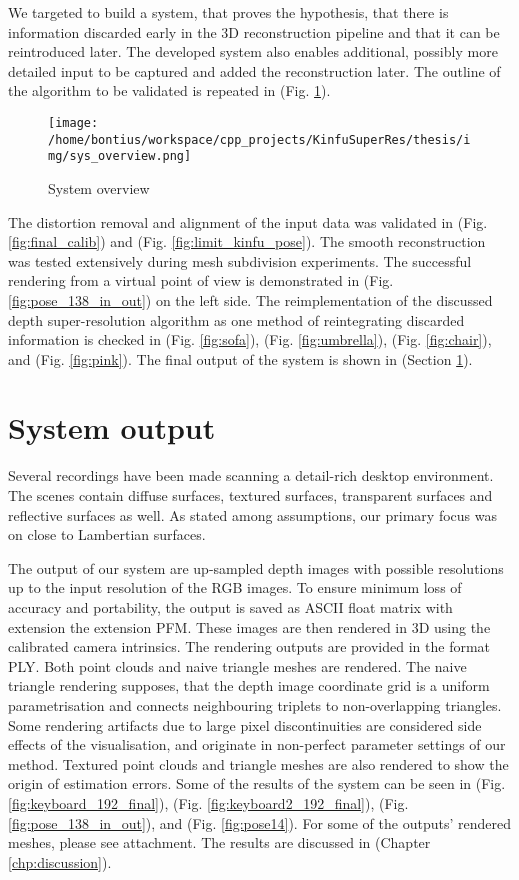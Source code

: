 \documentclass{ucl_thesis}
\newcommand{\figref}[1]{(Fig. \ref{#1})}
\newcommand{\secref}[1]{(Section \ref{#1})}
\newcommand{\chpref}[1]{(Chapter \ref{#1})}
\begin{document}
We targeted to build a system, that proves the hypothesis, that there is information discarded early in the 3D reconstruction pipeline and that it can be reintroduced later. The developed system also enables additional, possibly more detailed input to be captured and added the reconstruction later. The outline of the algorithm to be validated is repeated in \figref{fig:sys_overview2}.

\begin{figure}[h!]\centering
    \texttt{[image: /home/bontius/workspace/cpp\_projects/KinfuSuperRes/thesis/img/sys\_overview.png]}
    \caption{System overview}
    \label{fig:sys_overview2}
\end{figure}

The distortion removal and alignment of the input data was validated in \figref{fig:final_calib} and \figref{fig:limit_kinfu_pose}. The smooth reconstruction was tested extensively during mesh subdivision experiments. The successful rendering from a virtual point of view is demonstrated in \figref{fig:pose_138_in_out} on the left side. The reimplementation of the discussed depth super-resolution algorithm as one method of reintegrating discarded information is checked in \figref{fig:sofa}, \figref{fig:umbrella}, \figref{fig:chair}, and \figref{fig:pink}. The final output of the system is shown in \secref{sec:results}.

\section{System output}
\label{sec:results}

\par Several recordings have been made scanning a detail-rich desktop environment. The scenes contain diffuse surfaces, textured surfaces, transparent surfaces and reflective surfaces as well. As stated among assumptions, our primary focus was on close to Lambertian surfaces. 
\par The output of our system are up-sampled depth images with possible resolutions up to the input resolution of the RGB images. To ensure minimum loss of accuracy and portability, the output is saved as ASCII float matrix with extension the extension PFM. These images are then rendered in 3D using the calibrated camera intrinsics. The rendering outputs are provided in the format PLY. Both point clouds and naive triangle meshes are rendered. The naive triangle rendering supposes, that the depth image coordinate grid is a uniform parametrisation and connects neighbouring triplets to non-overlapping triangles. Some rendering artifacts due to large pixel discontinuities are considered side effects of the visualisation, and originate in non-perfect parameter settings of our method. Textured point clouds and triangle meshes are also rendered to show the origin of estimation errors. Some of the results of the system can be seen in \figref{fig:keyboard_192_final}, \figref{fig:keyboard2_192_final}, \figref{fig:pose_138_in_out}, and \figref{fig:pose14}. For some of the outputs' rendered meshes, please see attachment. The results are discussed in \chpref{chp:discussion}.
\end{document}
